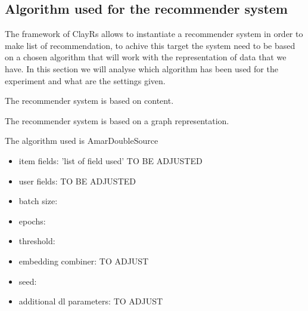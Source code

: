 \documentclass[11pt]{article}
\begin{document}

\hfill\break
\hfill\break


\subsection{Algorithm used for the recommender system}\label{subsec:algo}
The framework of ClayRs allows to instantiate a recommender system in order to make list of recommendation, to achive
this target the system need to be based on a chosen algorithm that will work with the representation of data that
we have.
In this section we will analyse which algorithm has been used for the experiment and what are the settings
given.

The recommender system is based on content.

The recommender system is based on a graph representation.


The algorithm used is AmarDoubleSource
\begin{itemize}
    \item item fields: 'list of field used' TO BE ADJUSTED
    \item user fields: TO BE ADJUSTED
    \item batch size: 
    \item epochs: 
    \item threshold: 
    \item embedding combiner: TO ADJUST
    \item seed: 
    \item additional dl parameters: TO ADJUST
\end{itemize}
\end{document}
